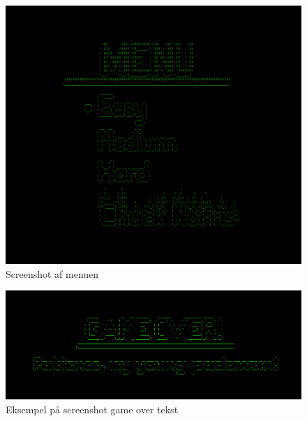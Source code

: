 \begin{figure}[h!]
\centering
\includegraphics[scale=0.25]{figs/screenshots/menu_crop.png}
\caption{Screenshot af menuen}
\label{fig:menu_2}
\end{figure}



\begin{figure}[h!]
\centering
\includegraphics[scale=0.25]{figs/screenshots/gameover_crop.png}
\caption{Eksempel på screenshot game over tekst}
\label{fig:gameover_2}
\end{figure}



